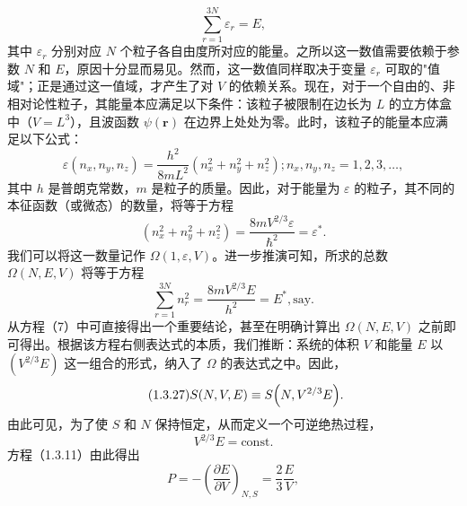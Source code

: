 \begin{equation}\tag{1.3.23}\label{eq:1.3.23}
\sum _ { r = 1 } ^{3 N} \varepsilon _ { r } = E ,
\end{equation}
其中 \(\varepsilon_{r}\) 分别对应 \(N\) 个粒子各自由度所对应的能量。之所以这一数值需要依赖于参数 \(N\) 和 \(E\)，原因十分显而易见。然而，这一数值同样取决于变量 \(\varepsilon_{r}\) 可取的"值域"；正是通过这一值域，才产生了对 \(V\) 的依赖关系。现在，对于一个自由的、非相对论性粒子，其能量本应满足以下条件：该粒子被限制在边长为 \(L\) 的立方体盒中（\(V=L^{3}\)），且波函数 \(\psi(\boldsymbol{r})\) 在边界上处处为零。此时，该粒子的能量本应满足以下公式：
\begin{equation}\tag{1.3.24}\label{eq:1.3.24}
\varepsilon ( n _ { x } , n _ { y } , n _ { z } ) = \frac { h ^{2} } { 8 m L ^{2} } ( n _ { x } ^{2} + n _ { y } ^{2} + n _ { z } ^{2} ) ;  n _ { x } , n _ { y } , n _ { z } = 1 , 2 , 3 , \ldots ,
\end{equation}
其中 \(h\) 是普朗克常数，\(m\) 是粒子的质量。因此，对于能量为 \(\varepsilon\) 的粒子，其不同的本征函数（或微态）的数量，将等于方程
\begin{equation}\tag{1.3.25}\label{eq:1.3.25}
\left( n _ { x } ^{2} + n _ { y } ^{2} + n _ { z } ^{2} \right) = \frac { 8 m V ^{2 / 3} \varepsilon } { \hbar ^{2} } = \varepsilon ^{*} .
\end{equation}
我们可以将这一数量记作 \(\Omega(1,\varepsilon,V)\)。进一步推演可知，所求的总数 \(\Omega(N,E,V)\) 将等于方程
\begin{equation}\tag{1.3.26}\label{eq:1.3.26}
\sum _ { r = 1 } ^{3 N} n _ { r } ^{2} = \frac { 8 m V ^{2 / 3} E } { h ^{2} } = E ^{*} ,  \mathrm { s a y } .
\end{equation}
从方程（7）中可直接得出一个重要结论，甚至在明确计算出 \(\Omega(N,E,V)\) 之前即可得出。根据该方程右侧表达式的本质，我们推断：系统的体积 \(V\) 和能量 \(E\) 以 \((V^{2/3}E)\) 这一组合的形式，纳入了 \(\Omega\) 的表达式之中。因此，
\begin{equation}\tag{1.3.27}\label{eq:1.3.27}
S ( N , V , E ) \equiv S \Bigl ( N , V ^{2 / 3} E \Bigr ) .
\end{equation}
由此可见，为了使 \(S\) 和 \(N\) 保持恒定，从而定义一个可逆绝热过程，
\begin{equation}\tag{1.3.28}\label{eq:1.3.28}
V ^{2 / 3} E = \mathrm { c o n s t . }
\end{equation}
方程（1.3.11）由此得出
\begin{equation}\tag{1.3.29}\label{eq:1.3.29}
P = - \left( { \frac { \partial E } { \partial V } } \right) _ { N , S } = { \frac { 2 } { 3 } } { \frac { E } { V } } ,
\end{equation}
